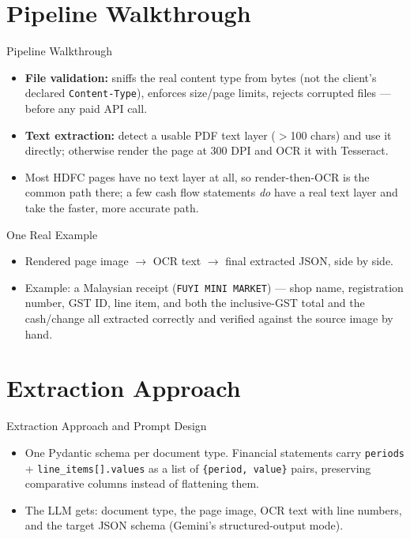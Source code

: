 \documentclass[11pt]{beamer}
\begin{document}
\section{Pipeline Walkthrough}
\begin{frame}{Pipeline Walkthrough}
  \begin{itemize}
    \item \textbf{File validation:} sniffs the real content type from bytes (not the
      client's declared \texttt{Content-Type}), enforces size/page limits, rejects
      corrupted files --- before any paid API call.
    \item \textbf{Text extraction:} detect a usable PDF text layer ($>$100 chars) and
      use it directly; otherwise render the page at 300 DPI and OCR it with
      Tesseract.
    \item Most HDFC pages have no text layer at all, so render-then-OCR is the common
      path there; a few cash flow statements \emph{do} have a real text layer and
      take the faster, more accurate path.
  \end{itemize}
\end{frame}

\begin{frame}{One Real Example}
  \begin{itemize}
    \item Rendered page image $\rightarrow$ OCR text $\rightarrow$ final extracted
      JSON, side by side.
    \item Example: a Malaysian receipt (\texttt{FUYI MINI MARKET}) --- shop name,
      registration number, GST ID, line item, and both the inclusive-GST total and
      the cash/change all extracted correctly and verified against the source image
      by hand.
  \end{itemize}
\end{frame}

\section{Extraction Approach}
\begin{frame}{Extraction Approach and Prompt Design}
  \begin{itemize}
    \item One Pydantic schema per document type. Financial statements carry
      \texttt{periods} + \texttt{line\_items[].values} as a list of
      \texttt{\{period, value\}} pairs, preserving comparative columns instead of
      flattening them.
    \item The LLM gets: document type, the page image, OCR text with line numbers,
      and the target JSON schema (Gemini's structured-output mode).
  \end{itemize}
\end{frame}
\end{document}
